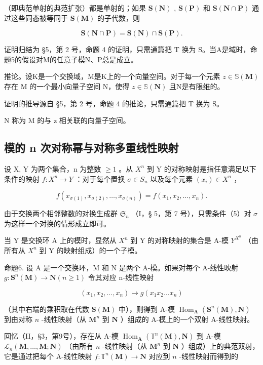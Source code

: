 （即典范单射的典范扩张）都是单射的；如果 \(\mathbf{S}(\mathbf{N})\) , \(\mathbf{S}(\mathbf{P})\) 和 \(\mathbf{S}(\mathbf{N} \cap \mathbf{P})\) 通过这些同态被等同于 \(\mathbf{S}(\mathbf{M})\) 的子代数，则

\[
\mathbf {S} (\mathbf {N} \cap \mathbf {P}) = \mathbf {S} (\mathbf {N}) \cap \mathbf {S} (\mathbf {P}).\tag{4}
\]

证明归结为 §5，第 2 号，命题 4 的证明，只需通篇把 T 换为 S。当A是域时，命题5的假设对M的任意子模N、P总是成立。

推论。设K是一个交换域，M是K上的一个向量空间。对于每一个元素 \(z \in \mathbb{S}(\mathbf{M})\) 存在 M 的一个最小向量子空间 N，使得 \(z \in \mathbb{S}(\mathbf{N})\) 且N是有限维的。

证明的推导源自 §5，第 2 号，命题 4 的推论，只需通篇把 T 换为 S。

N 称为 M 的与 z 相关联的向量子空间。

\subsection{模的 n 次对称幂与对称多重线性映射}

设 X, Y 为两个集合，n 为整数 \(\geqslant1\) 。从 \(X^{n}\) 到 Y 的对称映射是指任意满足以下条件的映射 \(f: X^{n} \to Y\) ：对于每个置换 \(\sigma \in S_{n}\) 以及每个元素 \((x_{i}) \in X^{n}\) ，

\[
f (x _ {\sigma (1)}, x _ {\sigma (2)}, \dots , x _ {\sigma (n)}) = f (x _ {1}, x _ {2}, \dots , x _ {n}).\tag{5}
\]

由于交换两个相邻整数的对换生成群 \(\mathfrak{S}_n\) （I，§ 5，第 7 号），只需条件（5）对 \(\sigma\) 为这样一个对换的情形成立即可。

当 Y 是交换环 A 上的模时，显然从 \(X^{n}\) 到 Y 的对称映射的集合是 A-模 \(Y^{X^{n}}\) （由所有从 \(X^{n}\) 到 Y 的映射组成）的一个子模。

命题6. 设 A 是一个交换环，M 和 N 是两个 A-模。如果对每个 A-线性映射 \(g: \mathbf{S}^n(\mathbf{M}) \to \mathbf{N} (n \geqslant 1)\) 令其对应 n-线性映射

\[
\left(x _ {1}, x _ {2}, \dots , x _ {n}\right) \mapsto g \left(x _ {1} x _ {2} \dots x _ {n}\right)\tag{6}
\]

（其中右端的乘积取在代数 \(\mathbf{S}(\mathbf{M})\) 中），则得到 A-模 \(\operatorname{Hom}_{\mathbf{A}}(\mathbf{S}^{n}(\mathbf{M}), \mathbf{N})\) 到由对称 \(n\) -线性映射（从 \(\mathbf{M}^{n}\) 到 \(\mathbf{N}\) ）组成的 A-模上的一个双射 A-线性映射。

回忆（II，§3，第9号），存在从 A-模 \(\operatorname{Hom}_{\mathbf{A}}(\mathbb{T}^{n}(\mathbf{M}), \mathbf{N})\) 到 A-模 \(\mathcal{L}_{n}(\mathbf{M}, \ldots, \mathbf{M}; \mathbf{N})\) （由所有 \(n\) -线性映射（从 \(\mathbf{M}^{n}\) 到 \(\mathbf{N}\) ）组成）上的典范双射，它是通过把每个 A-线性映射 \(f: \mathbb{T}^{n}(\mathbf{M}) \to \mathbf{N}\) 对应到 \(n\) -线性映射而得到的


